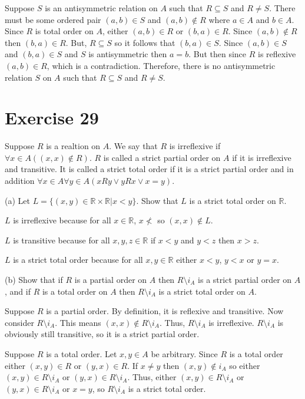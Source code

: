 \documentclass[11pt]{article}
\begin{document}
Suppose $S$ is an antisymmetric relation on $A$ such that $R \subseteq S$ and 
$R \neq S$. There must be some ordered pair $(a,b) \in S$ and $(a,b) \notin R$
where $a \in A$ and $b \in A$. Since $R$ is total order on $A$, either 
$(a,b) \in R$ or $(b,a) \in R$. Since $(a,b) \notin R$ then $(b,a) \in R$.
But, $R \subseteq S$ so it follows that $(b,a) \in S$. Since $(a,b) \in S$ and 
$(b,a) \in S$ and $S$ is antisymmetric then $a=b$. But then since $R$ is reflexive
$(a,b) \in R$, which is a contradiction. Therefore, there is no antisymmetric
relation $S$ on $A$ such that $R \subseteq S$ and $R \neq S$.

\section*{Exercise 29}

Suppose $R$ is a realtion on $A$. We say that $R$ is irreflexive if 
$\forall x \in A ((x,x) \notin R)$. $R$ is called a strict partial order on $A$ 
if it is irreflexive and transitive. It is called a strict total order if it is 
a strict partial order and in addition 
$\forall x \in A \forall y \in A (xRy \vee yRx \vee x = y)$.

\noindent (a) Let $L = \{(x,y) \in \mathbb{R} \times \mathbb{R} | x < y\}$. 
Show that $L$ is a strict total order on $\mathbb{R}$.

$L$ is irreflexive because for all $x \in \mathbb{R}$, $x \nless$ so $(x,x) \notin L$.

$L$ is transitive because for all $x,y,z \in \mathbb{R}$ if $x < y$ and $y<z$ 
then $x > z$.

$L$ is a strict total order because for all $x,y \in \mathbb{R}$ either 
$x<y$, $y<x$ or $y=x$.

\noindent (b) Show that if $R$ is a partial order on $A$ then $R \setminus i_A$
is a strict partial order on $A$, and if $R$ is a total order on $A$ then 
$R \setminus i_A$ is a strict total order on $A$.

Suppose $R$ is a partial order. By definition, it is reflexive and transitive.
Now consider $R \setminus i_A$. This means $(x,x) \notin R \setminus i_A$.
Thus, $R \setminus i_A$ is irreflexive. $R \setminus i_A$ is obviously still 
transitive, so it is a strict partial order.

Suppose $R$ is a total order. Let $x,y \in A$ be arbitrary. Since $R$ is a total 
order either $(x,y) \in R$ or $(y,x) \in R$. If $x \neq y$ then $(x,y) \notin i_A$
so either $(x,y) \in R \setminus i_A$ or $(y,x) \in R \setminus i_A$. Thus, either 
$(x,y) \in R \setminus i_A$ or $(y,x) \in R \setminus i_A$ or $x=y$, so 
$R \setminus i_A$ is a strict total order.
\end{document}
